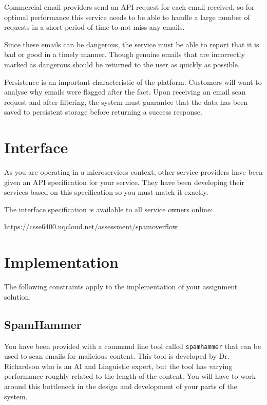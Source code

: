 \documentclass{csse4400}
\begin{document}
Commercial email providers send an API request for each email received, so for optimal performance this service needs to be able to handle a large number of requests in a short period of time to not miss any emails.

Since these emails can be dangerous, the service must be able to report that it is bad or good in a timely manner. Though genuine emails that are incorrectly marked as dangerous should be returned to the user as quickly as possible.

Persistence is an important characteristic of the platform. Customers will want to analyse why emails were flagged after the fact. Upon receiving an email scan request and after filtering, the system must guarantee that the data has been saved to persistent storage before returning a success response.

\section{Interface}
As you are operating in a microservices context, other service providers have been given an API specification for your service. They have been developing their services based on this specification so you must match it exactly.

The interface specification is available to all service owners online: 

\url{https://csse6400.uqcloud.net/assessment/spamoverflow}

\section{Implementation}
The following constraints apply to the implementation of your assignment solution.

\subsection{SpamHammer}


You have been provided with a command line tool called \texttt{spamhammer} that can be used to scan emails for malicious content. This tool is developed by Dr. Richardson who is an AI and Linguistic expert, but the tool has varying performance roughly related to the length of the content. You will have to work around this bottleneck in the design and development of your parts of the system.
\end{document}
